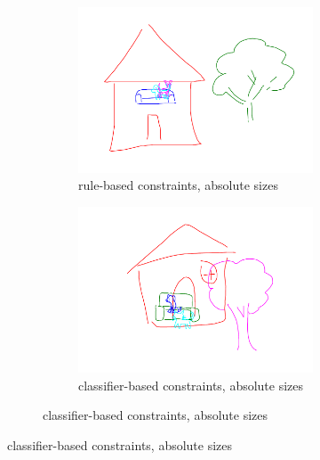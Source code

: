 \begin{figure}[ht]
    \captionsetup[subfigure]{labelformat=empty}
    \centering
        \begin{subfigure}{\textwidth}
            \centering
            \caption{(1) }
            \begin{subfigure}[t]{0.45\textwidth}
                \includegraphics[width=\textwidth]{figures/drawing_1_ra.pdf}
                \caption{rule-based constraints, absolute sizes}
            \end{subfigure}
            \hfill
            \begin{subfigure}[t]{0.45\textwidth}
                \includegraphics[width=\textwidth]{figures/drawing_1_ca.pdf}
                \caption{classifier-based constraints, absolute sizes}

\end{subfigure}
\end{subfigure}
\end{figure}
